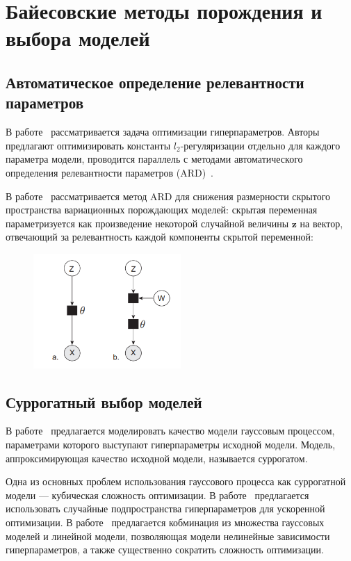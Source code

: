 \section{Байесовские методы порождения и выбора моделей}
\subsection*{Автоматическое определение релевантности параметров}
В работе~\cite{hyper} рассматривается задача оптимизации гиперпараметров.  Авторы предлагают оптимизировать константы $l_2$-регуляризации отдельно для каждого параметра модели, проводится параллель с методами автоматического определения релевантности параметров (ARD)~\cite{MacKay}.

В работе~\cite{ard} рассматривается метод ARD для снижения размерности скрытого пространства вариационных порождающих моделей: скрытая переменная параметризуется как  произведение некоторой случайной величины $\mathbf{z}$  на вектор, отвечающий за релевантность каждой компоненты скрытой переменной:
\begin{figure}[H]
\includegraphics[width=0.5\textwidth]{./plots/arch_review_figs/ard.png}
\end{figure}

\subsection*{Суррогатный выбор моделей}
В работе~\cite{bo_gp} предлагается моделировать качество модели гауссовым процессом, параметрами которого выступают гиперпараметры исходной модели.
Модель, аппроксимирующая качество исходной модели, называется суррогатом. 

Одна из основных проблем использования гауссового процесса как суррогатной модели --- кубическая сложность оптимизации. В работе~\cite{random_gaus} предлагается использовать случайные подпространства гиперпараметров для ускоренной оптимизации.  В работе~\cite{gp_tree} предлагается кобминация из множества гауссовых моделей и линейной модели, позволяющая модели нелинейные зависимости гиперпараметров, а также существенно сократить сложность оптимизации. 

